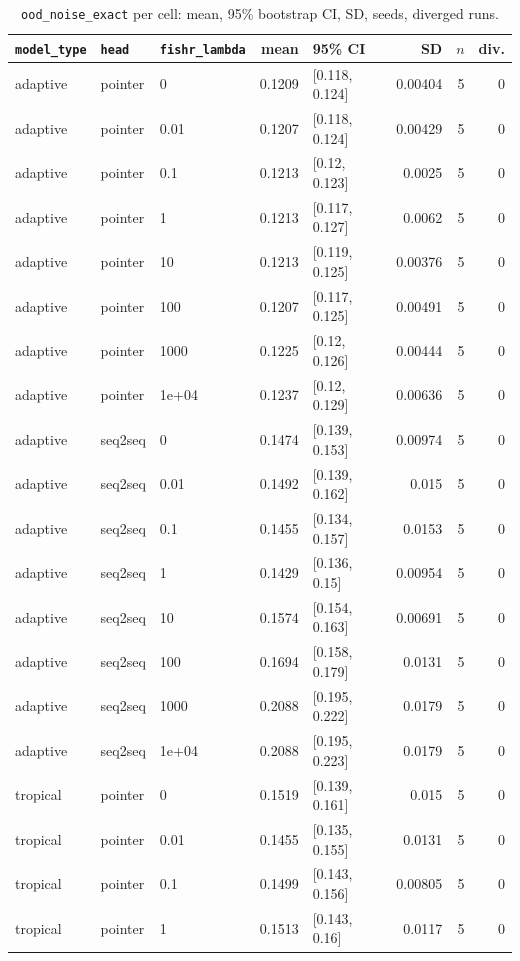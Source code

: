\documentclass[10pt]{article}
\begin{document}
{\small
\begin{longtable}{lllrlrrr}
\caption{\texttt{ood\_noise\_exact} per cell: mean, 95\% bootstrap CI, SD, seeds, diverged runs.}\label{tab:summary-ood_noise_exact}\\
\toprule
\texttt{model\_type} & \texttt{head} & \texttt{fishr\_lambda} & mean & 95\% CI & SD & $n$ & div.\\
\midrule
\endhead
adaptive & pointer & 0 & 0.1209 & [0.118, 0.124] & 0.00404 & 5 & 0\\
adaptive & pointer & 0.01 & 0.1207 & [0.118, 0.124] & 0.00429 & 5 & 0\\
adaptive & pointer & 0.1 & 0.1213 & [0.12, 0.123] & 0.0025 & 5 & 0\\
adaptive & pointer & 1 & 0.1213 & [0.117, 0.127] & 0.0062 & 5 & 0\\
adaptive & pointer & 10 & 0.1213 & [0.119, 0.125] & 0.00376 & 5 & 0\\
adaptive & pointer & 100 & 0.1207 & [0.117, 0.125] & 0.00491 & 5 & 0\\
adaptive & pointer & 1000 & 0.1225 & [0.12, 0.126] & 0.00444 & 5 & 0\\
adaptive & pointer & 1e+04 & 0.1237 & [0.12, 0.129] & 0.00636 & 5 & 0\\
adaptive & seq2seq & 0 & 0.1474 & [0.139, 0.153] & 0.00974 & 5 & 0\\
adaptive & seq2seq & 0.01 & 0.1492 & [0.139, 0.162] & 0.015 & 5 & 0\\
adaptive & seq2seq & 0.1 & 0.1455 & [0.134, 0.157] & 0.0153 & 5 & 0\\
adaptive & seq2seq & 1 & 0.1429 & [0.136, 0.15] & 0.00954 & 5 & 0\\
adaptive & seq2seq & 10 & 0.1574 & [0.154, 0.163] & 0.00691 & 5 & 0\\
adaptive & seq2seq & 100 & 0.1694 & [0.158, 0.179] & 0.0131 & 5 & 0\\
adaptive & seq2seq & 1000 & 0.2088 & [0.195, 0.222] & 0.0179 & 5 & 0\\
adaptive & seq2seq & 1e+04 & 0.2088 & [0.195, 0.223] & 0.0179 & 5 & 0\\
tropical & pointer & 0 & 0.1519 & [0.139, 0.161] & 0.015 & 5 & 0\\
tropical & pointer & 0.01 & 0.1455 & [0.135, 0.155] & 0.0131 & 5 & 0\\
tropical & pointer & 0.1 & 0.1499 & [0.143, 0.156] & 0.00805 & 5 & 0\\
tropical & pointer & 1 & 0.1513 & [0.143, 0.16] & 0.0117 & 5 & 0\\

\end{longtable}}
\end{document}
